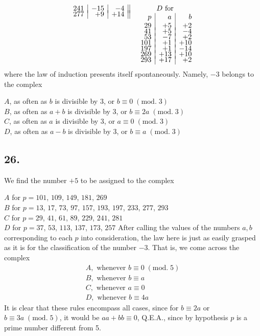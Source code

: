 \documentclass[twoside,12pt, showframe]{memoir}
\renewenvironment{quote}%
  {\list{}{\leftmargin=5em\rightmargin=0em}\item[]}%
  {\endlist}
\renewcommand{\pmod}[1]{\;(\textrm{mod.}\;#1)}
\begin{document}
\begin{quote}
\[\begin{array}{cccc}
\begin{array}[t]{r|r|r||}
      241&-15&-4 \\[-4pt]
      277 & +9 & +14 
    \end{array}
    &
    \begin{array}[t]{r|r|r} 
      \multicolumn{3}{c}{D\text{ for }}\\
      p & a & b \\
      29&+5&+2\\[-4pt]
      41&+5&-4\\[-4pt]
      53&-7&+2\\[-4pt]
      101&+1&+10\\[-4pt]
      197&+1&-14\\[-4pt]
      269&+13&+10\\[-4pt]
      293&+17&+2 
    \end{array}
  \end{array}\]
  where the law of induction presents itself spontaneously. Namely, \(-3\) belongs to the complex
  \begin{quote}
    \(A\), as often as \(b\) is divisible by 3, or \(b \equiv 0\pmod{3}\)\\
    \(B\), as often as \(a+b\) is divisible by 3, or \(b \equiv 2 a\pmod{3}\)\\
    \(C\), as often as \(a\) is divisible by 3, or \(a \equiv 0\pmod{3}\)\\
    \(D\), as often as \(a-b\) is divisible by 3, or \(b \equiv a\pmod{3}\)
  \end{quote}
\end{quote}
%

\subsection*{26.}

We find the number \(+5\) to be assigned to the complex
\begin{quote}
\(A\) for \(p=101\), \(109\), \(149\), \(181\), \(269\) \\
\(B\) for \(p=13\), \(17\), \(73\), \(97\), \(157\), \(193\), \(197\), \(233\), \(277\), \(293\) \\
\(C\) for \(p=29\), \(41\), \(61\), \(89\), \(229\), \(241\), \(281\) \\
\(D\) for \(p=37\), \(53\), \(113\), \(137\), \(173\), \(257\)\end{quote}
After calling the values of the numbers \(a, b\) corresponding to each \(p\) into consideration, the law here is just as easily grasped as it is for the classification of the number \(-3\). That is, we come across the complex
\[\begin{array}{l}
A, \text{ whenever } b \equiv 0\pmod{5} \\
B, \text{ whenever } b \equiv a \\
C, \text{ whenever } a \equiv 0 \\
D, \text{ whenever } b \equiv 4 a
\end{array}\]
It is clear that these rules encompass all cases, since for \(b \equiv 2 a\) or \( b \equiv 3 a\pmod{5}\), it would be \(a a+b b \equiv 0\), Q.E.A., since by hypothesis \(p\) is a prime number different from 5.
%
\end{document}

